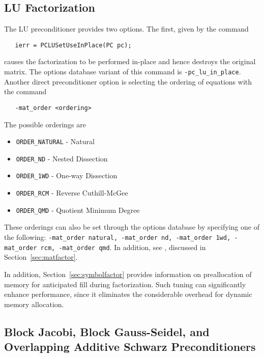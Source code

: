 
\subsection{LU Factorization}

The LU preconditioner provides two options.  The first, given by
the 
command  
\begin{verbatim}
   ierr = PCLUSetUseInPlace(PC pc);
\end{verbatim}
causes the factorization to be performed in-place and hence
destroys the original matrix.  The options database variant of
this command is {\tt -pc\_lu\_in\_place}. 
Another direct preconditioner option is selecting the ordering
of equations with the command  
\begin{verbatim}
   -mat_order <ordering>
\end{verbatim}
The possible orderings are
\begin{itemize}
\item {\tt ORDER\_NATURAL} - Natural
\item {\tt ORDER\_ND} - Nested Dissection
\item {\tt ORDER\_1WD} - One-way Dissection
\item {\tt ORDER\_RCM} - Reverse Cuthill-McGee
\item {\tt ORDER\_QMD} - Quotient Minimum Degree
\end{itemize}
  
  
  
 
These orderings can also be set through the options database by specifying 
one of the following:  {\tt -mat\_order natural, -mat\_order nd, 
-mat\_order 1wd, -mat\_order rcm, -mat\_order qmd}.
In addition, see 
, discussed in Section~\ref{sec:matfactor}.

In addition, Section~\ref{sec:symbolfactor} provides information on
preallocation of memory for anticipated fill during factorization.  
Such tuning can significantly enhance performance, since it
eliminates the considerable overhead for dynamic memory allocation.

\subsection{Block Jacobi, Block Gauss-Seidel, and 
            Overlapping Additive Schwarz Preconditioners}
\label{sec:bjacobi}


